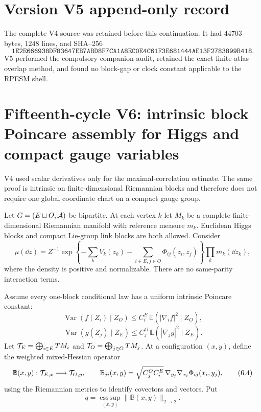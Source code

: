 \documentclass[11pt]{article}
\theoremstyle{remark}
\begin{document}
\section*{Version V5 append-only record}
The complete V4 source was retained before this continuation.  It
had \(44703\) bytes, \(1248\) lines, and SHA--256
\[
 \texttt{1E2E666938DF83647EB7ABD8F7CA1A8EC0E4C61F3E681444AE13F2783899B418}.
\]
V5 performed the compulsory companion audit, retained the exact
finite-atlas overlap method, and found no block-gap or clock
constant applicable to the RPESM shell.


\section{Fifteenth-cycle V6: intrinsic block Poincare assembly for Higgs and compact gauge variables}
\label{sec:v15v6}

V4 used scalar derivatives only for the maximal-correlation
estimate.  The same proof is intrinsic on finite-dimensional
Riemannian blocks and therefore does not require one global
coordinate chart on a compact gauge group.

Let \(G=(E\sqcup O,{\cal A})\) be bipartite.  At each vertex \(k\)
let \(M_k\) be a complete finite-dimensional Riemannian manifold
with reference measure \(m_k\).  Euclidean Higgs blocks and compact
Lie-group link blocks are both allowed.  Consider
\[
 \mu(\dd z)=Z^{-1}\exp\left\{
 -\sum_kV_k(z_k)
 -\sum_{i\in E,j\in O}\Phi_{ij}(z_i,z_j)
 \right\}\prod_km_k(\dd z_k),                                \tag{6.1}
\]
where the density is positive and normalizable.  There are no
same-parity interaction terms.

Assume every one-block conditional law has a uniform intrinsic
Poincare constant:
\[
 \operatorname{Var}(f(Z_i)\mid Z_O)
 \le C_i^E\,\mathbb E(|\nabla_if|^2\mid Z_O),                 \tag{6.2}
\]
\[
 \operatorname{Var}(g(Z_j)\mid Z_E)
 \le C_j^O\,\mathbb E(|\nabla_jg|^2\mid Z_E).                 \tag{6.3}
\]
Let \({\cal T}_E=\bigoplus_{i\in E}TM_i\) and
\({\cal T}_O=\bigoplus_{j\in O}TM_j\).  At a configuration
\((x,y)\), define the weighted mixed-Hessian operator
\[
 {\mathbb B}(x,y):{\cal T}_{E,x}\longrightarrow{\cal T}_{O,y},
\qquad
 {\mathbb B}_{ji}(x,y)
 =\sqrt{C_j^OC_i^E}\,
   \nabla_{y_j}\nabla_{x_i}\Phi_{ij}(x_i,y_j),                \tag{6.4}
\]
using the Riemannian metrics to identify covectors and vectors.
Put
\[
 q=\operatorname*{ess\,sup}_{(x,y)}
   \|{\mathbb B}(x,y)\|_{2\to2}.                             \tag{6.5}
\]
\end{document}
